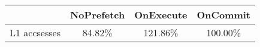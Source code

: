 \begin{tabular}{ l|ccc }
 & NoPrefetch & OnExecute & OnCommit\\ \hline
L1 accsesses & 84.82\% & 121.86\% & 100.00\%\\ \hline
\end{tabular}

